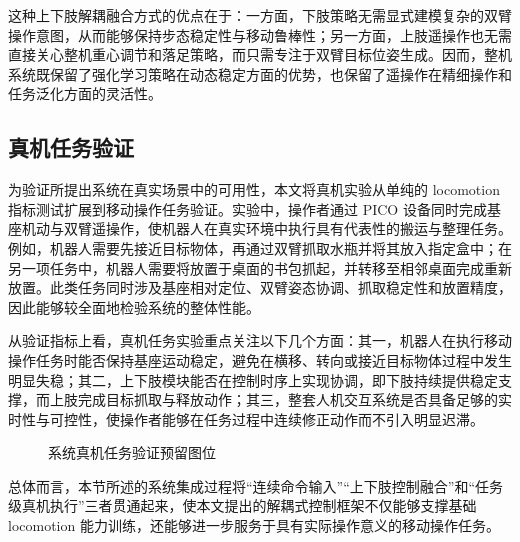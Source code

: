 这种上下肢解耦融合方式的优点在于：一方面，下肢策略无需显式建模复杂的双臂操作意图，从而能够保持步态稳定性与移动鲁棒性；另一方面，上肢遥操作也无需直接关心整机重心调节和落足策略，而只需专注于双臂目标位姿生成。因而，整机系统既保留了强化学习策略在动态稳定方面的优势，也保留了遥操作在精细操作和任务泛化方面的灵活性。

\subsection{真机任务验证}

为验证所提出系统在真实场景中的可用性，本文将真机实验从单纯的 locomotion 指标测试扩展到移动操作任务验证。实验中，操作者通过 PICO 设备同时完成基座机动与双臂遥操作，使机器人在真实环境中执行具有代表性的搬运与整理任务。例如，机器人需要先接近目标物体，再通过双臂抓取水瓶并将其放入指定盒中；在另一项任务中，机器人需要将放置于桌面的书包抓起，并转移至相邻桌面完成重新放置。此类任务同时涉及基座相对定位、双臂姿态协调、抓取稳定性和放置精度，因此能够较全面地检验系统的整体性能。

从验证指标上看，真机任务实验重点关注以下几个方面：其一，机器人在执行移动操作任务时能否保持基座运动稳定，避免在横移、转向或接近目标物体过程中发生明显失稳；其二，上下肢模块能否在控制时序上实现协调，即下肢持续提供稳定支撑，而上肢完成目标抓取与释放动作；其三，整套人机交互系统是否具备足够的实时性与可控性，使操作者能够在任务过程中连续修正动作而不引入明显迟滞。

\begin{figure}[H]
    \centering
    \caption{系统真机任务验证预留图位}
    \label{fig:whole-body-task-placeholder}
\end{figure}

总体而言，本节所述的系统集成过程将“连续命令输入”“上下肢控制融合”和“任务级真机执行”三者贯通起来，使本文提出的解耦式控制框架不仅能够支撑基础 locomotion 能力训练，还能够进一步服务于具有实际操作意义的移动操作任务。
